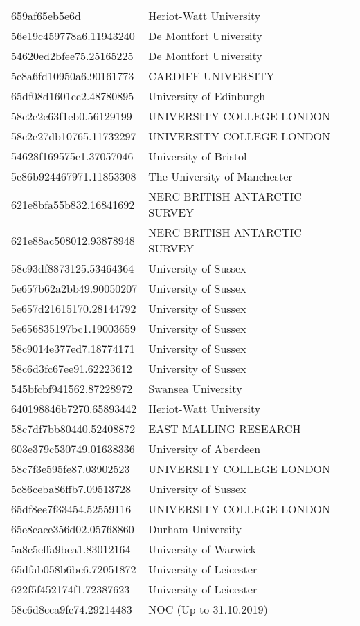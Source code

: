 \begin{tabular}{ll}
659af65eb5e6d & Heriot-Watt University \\
56e19c459778a6.11943240 & De Montfort University \\
54620ed2bfee75.25165225 & De Montfort University \\
5c8a6fd10950a6.90161773 & CARDIFF UNIVERSITY \\
65df08d1601cc2.48780895 & University of Edinburgh \\
58c2e2c63f1eb0.56129199 & UNIVERSITY COLLEGE LONDON \\
58c2e27db10765.11732297 & UNIVERSITY COLLEGE LONDON \\
54628f169575e1.37057046 & University of Bristol \\
5c86b924467971.11853308 & The University of Manchester \\
621e8bfa55b832.16841692 & NERC BRITISH ANTARCTIC SURVEY \\
621e88ac508012.93878948 & NERC BRITISH ANTARCTIC SURVEY \\
58c93df8873125.53464364 & University of Sussex \\
5e657b62a2bb49.90050207 & University of Sussex \\
5e657d21615170.28144792 & University of Sussex \\
5e656835197bc1.19003659 & University of Sussex \\
58c9014e377ed7.18774171 & University of Sussex \\
58c6d3fc67ee91.62223612 & University of Sussex \\
545bfcbf941562.87228972 & Swansea University \\
640198846b7270.65893442 & Heriot-Watt University \\
58c7df7bb80440.52408872 & EAST MALLING RESEARCH \\
603e379c530749.01638336 & University of Aberdeen \\
58c7f3e595fe87.03902523 & UNIVERSITY COLLEGE LONDON \\
5c86ceba86ffb7.09513728 & University of Sussex \\
65df8ee7f33454.52559116 & UNIVERSITY COLLEGE LONDON \\
65e8eace356d02.05768860 & Durham University \\
5a8c5effa9bea1.83012164 & University of Warwick \\
65dfab058b6bc6.72051872 & University of Leicester \\
622f5f452174f1.72387623 & University of Leicester \\
58c6d8cca9fc74.29214483 & NOC (Up to 31.10.2019) \\

\end{tabular}

